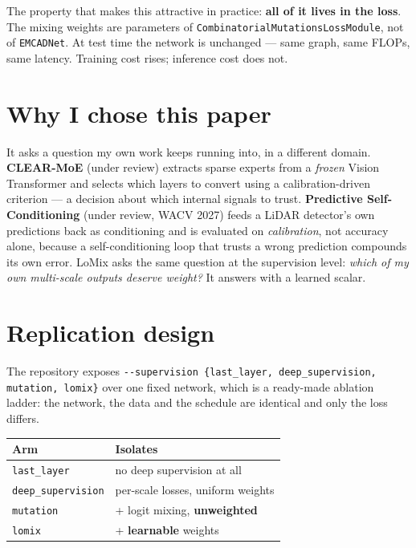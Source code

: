 \documentclass[11pt,a4paper]{article}
\newcommand{\code}[1]{\texttt{\small #1}}
\begin{document}
The property that makes this attractive in practice: \textbf{all of it lives in
the loss}. The mixing weights are parameters of
\code{CombinatorialMutationsLossModule}, not of \code{EMCADNet}. At test time
the network is unchanged --- same graph, same FLOPs, same latency. Training cost
rises; inference cost does not.

\section{Why I chose this paper}

It asks a question my own work keeps running into, in a different domain.
\textbf{CLEAR-MoE} (under review) extracts sparse experts from a \emph{frozen}
Vision Transformer and selects which layers to convert using a
calibration-driven criterion --- a decision about which internal signals to
trust. \textbf{Predictive Self-Conditioning} (under review, WACV 2027) feeds a
LiDAR detector's own predictions back as conditioning and is evaluated on
\emph{calibration}, not accuracy alone, because a self-conditioning loop that
trusts a wrong prediction compounds its own error. LoMix asks the same question
at the supervision level: \emph{which of my own multi-scale outputs deserve
weight?} It answers with a learned scalar.

\section{Replication design}

The repository exposes \code{-{}-supervision \{last\_layer, deep\_supervision,
mutation, lomix\}} over one fixed network, which is a ready-made ablation
ladder: the network, the data and the schedule are identical and only the loss
differs.

\begin{center}
\begin{tabular}{@{}ll@{}}
\toprule
\textbf{Arm} & \textbf{Isolates} \\
\midrule
\code{last\_layer} & no deep supervision at all \\
\code{deep\_supervision} & per-scale losses, uniform weights \\
\code{mutation} & + logit mixing, \textbf{unweighted} \\
\code{lomix} & + \textbf{learnable} weights \\
\bottomrule
\end{tabular}
\end{center}
\end{document}
